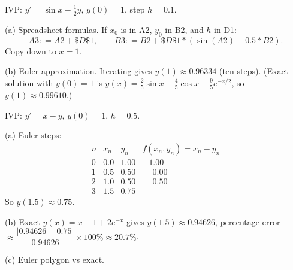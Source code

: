 \documentclass[11pt]{article}
\def\textbf#1{#1}%
\def\texttt#1{#1}%
\def\mathbf#1{#1}%
\begin{document}
\begin{solution}
IVP: $y'=\sin x-\tfrac12 y$, $y(0)=1$, step $h=0.1$.

\textbf{(a) Spreadsheet formulas.}
If $x_0$ is in \texttt{A2}, $y_0$ in \texttt{B2}, and $h$ in \texttt{D1}:
\[
\texttt{A3: }=A2+\$D\$1,\qquad
\texttt{B3: }=B2+\$D\$1*(\sin(A2)-0.5*B2).
\]
Copy down to $x=1$.

\textbf{(b) Euler approximation.}
Iterating gives $y(1)\approx \boxed{0.96334}$ (ten steps).
(Exact solution with $y(0)=1$ is $y(x)=\tfrac{2}{5}\sin x-\tfrac{4}{5}\cos x+\tfrac{9}{5}e^{-x/2}$,
so $y(1)\approx 0.99610$.)
\end{solution}

\begin{solution}
IVP: $y'=x-y$, $y(0)=1$, $h=0.5$.

\textbf{(a)} Euler steps:
\[
\begin{array}{c|c|c|c}
n&x_n&y_n&f(x_n,y_n)=x_n-y_n\\\hline
0&0.0&1.00&-1.00\\
1&0.5&0.50&\phantom{-}0.00\\
2&1.0&0.50&\phantom{-}0.50\\
3&1.5&\mathbf{0.75}&-
\end{array}
\]
So $y(1.5)\approx \boxed{0.75}$.

\textbf{(b)} Exact $y(x)=x-1+2e^{-x}$ gives $y(1.5)\approx 0.94626$,
percentage error $\approx \dfrac{|0.94626-0.75|}{0.94626}\times100\%\approx \boxed{20.7\%}$.

\textbf{(c) Euler polygon vs exact.}
\begin{center}
\end{center}
\end{solution}
\end{document}
